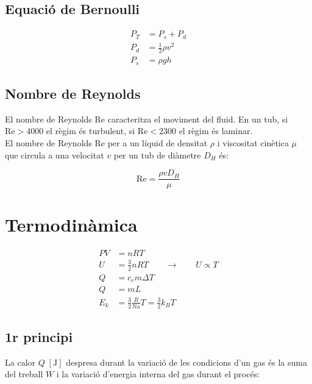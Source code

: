 \subsection{Equació de Bernoulli}
\label{sub:equaci_de_bernoulli}

\begin{align}
    P_T &= P_s + P_d\\
    P_d &= \frac{1}{2}\rho v^2\\
    P_s &= \rho g h
\end{align}

\subsection{Nombre de Reynolds}
\label{sub:nombre_de_reynolds}

El nombre de Reynolds  Re caracteritza el moviment del fluid. En un tub, si
$\mathrm{Re} > 4000$ el règim és turbulent, si $\mathrm{Re} < 2300$ el règim és laminar.\\

El nombre de Reynolds Re per a un líquid de densitat $\rho$ i viscositat cinètica $\mu$ que circula a una velocitat $v$ per un tub de diàmetre $D_H$ és:

\begin{equation}
    \mathrm{Re} = \frac{\rho v D_H}{\mu} 
\end{equation}

\section{Termodinàmica}
\label{sec:termodinamica}

\begin{align}
    PV &= nRT \\
    U &= \frac{3}{2}nRT \qquad \rightarrow \qquad U \propto T \\
    Q &= c_em\Delta T \\
    Q &= mL \\
    E_k &= \frac{3}{2} \frac{R}{\mathrm{Na}} T = \frac{3}{2}k_BT
\end{align}

\subsection{1r principi}
\label{sub:1r_principi}

La calor $Q\;[\si{\joule}]$ despresa durant la variació de les condicions d'un
gas és la suma del treball $W$ i la variació d'energia interna del gas durant
el procés:


